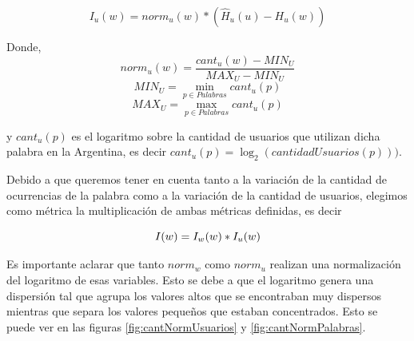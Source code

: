 \begin{equation}
I_u(w) = norm_{u}(w) * (\widehat{H}_{u}(u) - H_{u}(w))
\label{eq:iu}
\end{equation}

Donde,
\begin{equation}
norm_{u}(w) = \frac{cant_u(w)- MIN_U }{MAX_U - MIN_U}
\label{eq:norm2}
\end{equation}
\begin{equation}
 MIN_U = \min\limits_{p \in Palabras} cant_u(p)
\end{equation}
\begin{equation}
  MAX_U = \max\limits_{p \in Palabras} cant_u(p)
\end{equation}

y $cant_u(p)$ es el logaritmo sobre  la cantidad de usuarios que utilizan dicha palabra en la Argentina, es decir $cant_u(p)= \log_2(cantidadUsuarios(p)))$.

Debido a que queremos tener en cuenta tanto a la variación de la cantidad de ocurrencias de la palabra como a la variación de la cantidad de usuarios, elegimos como métrica la multiplicación de ambas métricas definidas, es decir  

\begin{equation}
I(w) =  I_w(w) * I_u(w)\\
\label{eq:ivalor}
\end{equation}

Es importante aclarar que tanto $norm_{w}$ como $norm_{u}$ realizan una normalización del logaritmo de esas variables. Esto se debe a que el logaritmo genera una dispersión tal que agrupa los valores altos que se encontraban muy dispersos mientras que separa los valores pequeños que estaban concentrados. Esto se puede ver en las figuras \ref{fig:cantNormUsuarios} y \ref{fig:cantNormPalabras}.




